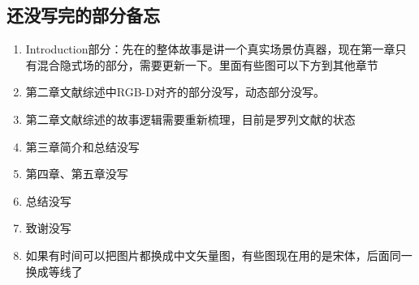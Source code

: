 %
%
%
%
%
%

\begin{appendices}
  \section{还没写完的部分备忘}
  \begin{enumerate}
      \item Introduction部分：先在的整体故事是讲一个真实场景仿真器，现在第一章只有混合隐式场的部分，需要更新一下。里面有些图可以下方到其他章节
      \item 第二章文献综述中RGB-D对齐的部分没写，动态部分没写。
      \item 第二章文献综述的故事逻辑需要重新梳理，目前是罗列文献的状态
      \item 第三章简介和总结没写
      \item 第四章、第五章没写
      \item 总结没写
      \item 致谢没写
      \item 如果有时间可以把图片都换成中文矢量图，有些图现在用的是宋体，后面同一换成等线了
  \end{enumerate}

\end{appendices}

